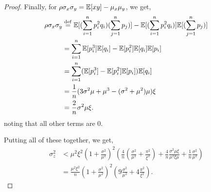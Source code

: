 \begin{proof}
  Finally, for $\rho \sigma_x \sigma_y = \mathbb{E}[x y] - \mu_x \mu_y$, we get,
  \begin{align*}
      \rho \sigma_x \sigma_y &\stackrel{\rm def}{=} \mathbb{E}[(\sum_{i=1}^n p^2_i q_i)(\sum_{j=1}^n p_j)] -  \mathbb{E}[(\sum_{i=1}^n p^2_i q_i)]\mathbb{E}[(\sum_{j=1}^n p_j)]\\
           &= \sum_{i=1}^n \mathbb{E}[p^3_i] \mathbb{E}[q_i] - \mathbb{E}[p^2_i] \mathbb{E}[q_i] \mathbb{E}[p_i] \\
           &= \sum_{i=1}^n (\mathbb{E}[p^3_i] - \mathbb{E}[p^2_i] \mathbb{E}[p_i]) \mathbb{E}[q_i] \\
           &= \frac{1}{n} (3\sigma^2 \mu + \mu^3 - (\sigma^2 + \mu^2) \mu) \xi \\
           &= \frac{2}{n} \sigma^2 \mu \xi.
  \end{align*}
  noting that all other terms are 0.

  Putting all of these together, we get,
  \begin{align*}
    \sigma_z^2 &< 
    \mu^2 \xi^2 {(1 + \frac{\sigma^2}{\mu^2})}^2
           \left(
           \frac{4}{n} (\frac{\sigma^2}{\mu^2} + \frac{\pi^2}{\xi^2})
              +
              \frac{4}{n} \frac{\sigma^2 \mu \xi}{\mu^2 \xi \mu}
              +
              \frac{1}{n} \frac{\sigma^2}{\mu^2}
              \right) \\
           &=
           \frac{\mu^2 \xi^2}{n} {\left( 1 + \frac{\sigma^2}{\mu^2} \right)}^2
             \left(
                9 \frac{\sigma^2}{\mu^2} + 4 \frac{\pi^2}{\xi^2}
                \right).
  \end{align*}



\end{proof}


